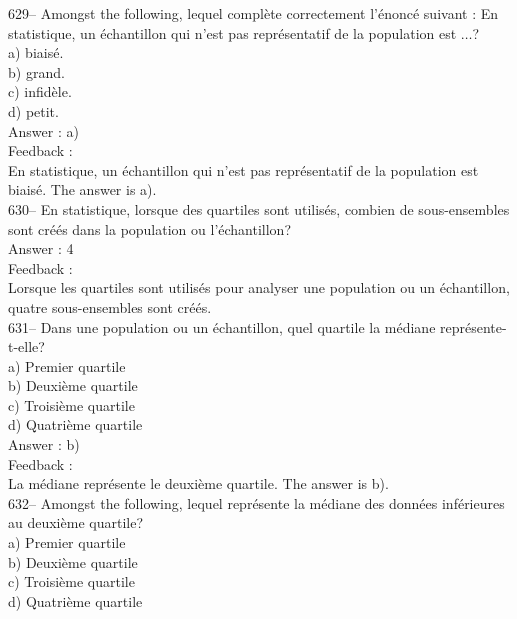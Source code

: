 ﻿\documentclass[letterpaper, 12pt]{article}
\begin{document}
629-- Amongst the following, lequel compl\`ete
correctement l'\'enonc\'e suivant : \og En statistique, un
\'echantillon qui n'est pas repr\'esentatif de la population est $\ldots$\fg ?\\
a) biais\'e.\\
b) grand.\\
c) infid\`ele.\\
d) petit.\\

Answer : a)\\

Feedback : \\
En statistique, un \'echantillon qui n'est pas repr\'esentatif de la
population est biais\'e.  The answer is a).\\

630-- En statistique, lorsque des quartiles sont utilis\'es, combien de
sous-ensembles sont cr\'e\'es dans la population ou l'\'echantillon?\\

Answer : 4\\

Feedback : \\
Lorsque les quartiles sont utilis\'es pour analyser une population ou un
\'echantillon, quatre sous-ensembles sont cr\'e\'es.\\

631-- Dans une population ou un \'echantillon, quel quartile la m\'ediane
repr\'esente-t-elle?\\
a) Premier quartile\\
b) Deuxi\`eme quartile\\
c) Troisi\`eme quartile\\
d) Quatri\`eme quartile\\

Answer : b)\\

Feedback : \\
La m\'ediane repr\'esente le deuxi\`eme quartile.  The answer is b).\\

632-- Amongst the following, lequel repr\'esente la m\'ediane
des donn\'ees inf\'erieures au deuxi\`eme quartile?\\
a) Premier quartile\\
b) Deuxi\`eme quartile\\
c) Troisi\`eme quartile\\
d) Quatri\`eme quartile\\
\end{document}
